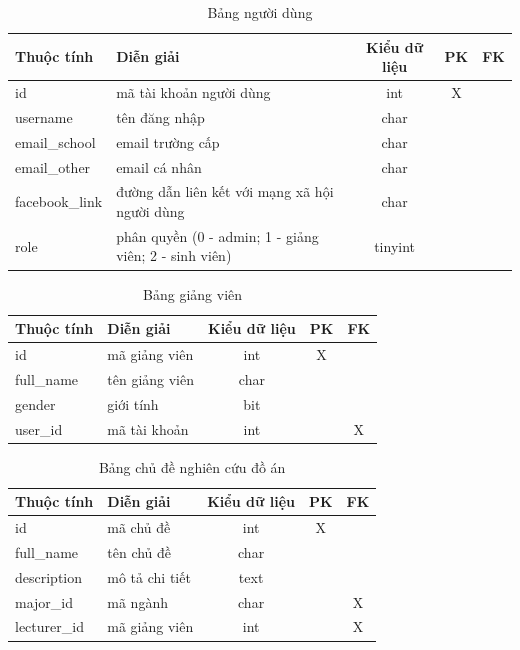     \begin{table}[h!]
      \centering
      \begin{tabular}{|l|p{}|c|c|c|}
        \hline
        \textbf{Thuộc tính} & \textbf{Diễn giải} & \textbf{Kiểu dữ liệu} & \textbf{PK} & \textbf{FK}\\
        \hline
        id & mã tài khoản người dùng & int & X &\\
        \hline
        username & tên đăng nhập & char & &\\
        \hline
        email\_school & email trường cấp & char & &\\
        \hline
        email\_other & email cá nhân & char & &\\
        \hline
        facebook\_link & đường dẫn liên kết với mạng xã hội người dùng & char & &\\
        \hline
        role & phân quyền (0 - admin; 1 - giảng viên; 2 - sinh viên) & tinyint & &\\
        \hline
      \end{tabular}
      \caption{Bảng người dùng}
    \end{table}

    \begin{table}[h!]
      \centering
      \begin{tabular}{|l|p{}|c|c|c|}
        \hline
        \textbf{Thuộc tính} & \textbf{Diễn giải} & \textbf{Kiểu dữ liệu} & \textbf{PK} & \textbf{FK}\\
        \hline
        id & mã giảng viên & int & X &\\
        \hline
        full\_name & tên giảng viên & char & &\\
        \hline
        gender & giới tính & bit & &\\
        \hline
        user\_id & mã tài khoản & int & & X\\
        \hline
      \end{tabular}
      \caption{Bảng giảng viên}
    \end{table}

    \begin{table}[h!]
      \centering
      \begin{tabular}{|l|p{}|c|c|c|}
        \hline
        \textbf{Thuộc tính} & \textbf{Diễn giải} & \textbf{Kiểu dữ liệu} & \textbf{PK} & \textbf{FK}\\
        \hline
        id & mã chủ đề & int & X &\\
        \hline
        full\_name & tên chủ đề & char & &\\
        \hline
        description & mô tả chi tiết & text & &\\
        \hline
        major\_id & mã ngành & char & & X\\
        \hline
        lecturer\_id & mã giảng viên & int & & X\\
        \hline
      \end{tabular}
      \caption{Bảng chủ đề nghiên cứu đồ án}
    \end{table}

